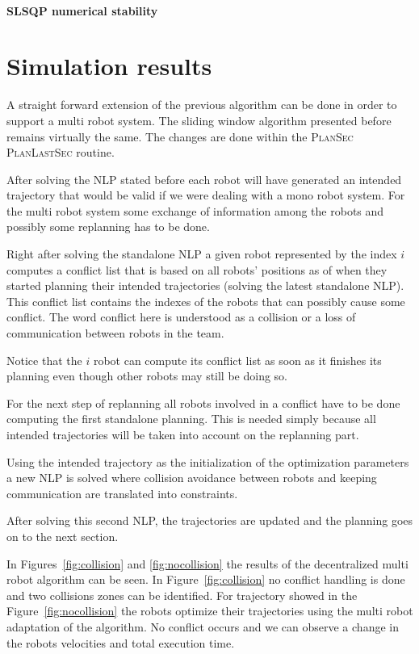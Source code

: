 \documentclass[eprint]{actapoly}
\begin{document}
\paragraph{SLSQP numerical stability}

\newpage
\mbox{}\newpage

\section{Simulation results}



A straight forward extension of the previous algorithm can be done in order to
support a multi robot system. The sliding window algorithm presented before 
remains
virtually the same. The changes are done within the {\scshape PlanSec} 
{\scshape PlanLastSec} routine.

After solving the NLP stated before each robot will have generated an intended 
trajectory that would be valid
if we were dealing with a mono robot system.
For the multi robot system some exchange of information among the robots and 
possibly some replanning has to be done.

Right after solving the standalone NLP a given robot represented by the index 
$i$ computes a conflict list that is based on 
all robots' positions as of when they started planning their intended 
trajectories (solving the latest standalone NLP).
This conflict list contains the indexes of
the robots  that can possibly cause some conflict. The word 
conflict here is understood as a collision or a loss of communication
between robots in the team.

Notice that the $i$ robot can compute its conflict list as soon as it finishes 
its planning even though other robots may still be doing so.

For the next step of replanning all robots involved in a conflict have to be 
done computing the first standalone planning. This is needed simply because
all intended trajectories will be taken into account on the replanning part.

Using the intended trajectory as the initialization of the optimization 
parameters a new NLP is solved where collision avoidance between robots
and keeping communication are translated into constraints.

After solving this second NLP, the trajectories are updated and the planning 
goes on to the next section.

In Figures~\ref{fig:collision} and \ref{fig:nocollision} the results of the 
decentralized multi robot algorithm can be seen.
In Figure~\ref{fig:collision} no conflict handling is done and two collisions 
zones can be identified.
For trajectory showed in the Figure~\ref{fig:nocollision} the robots optimize 
their trajectories using the multi robot
adaptation of the algorithm. No conflict occurs and we can observe a change in 
the robots velocities and total execution time.
\end{document}
